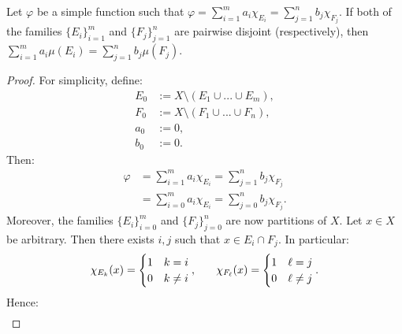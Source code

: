 \begin{lemma}
    Let $\varphi$ be a simple function such that $\varphi = \sum_{i = 1}^m a_i \chi_{E_i} = \sum_{j = 1}^n b_j \chi_{F_j}$. If both of the families $\{E_i\}_{i = 1}^m$ and $\{F_j\}_{j = 1}^n$ are pairwise disjoint (respectively), then $\sum_{i = 1}^m a_i \mu(E_i) = \sum_{j = 1}^n b_j \mu(F_j)$.
\end{lemma}
    \begin{proof}
        For simplicity, define:
            \begin{equation*}
            \begin{split}
                E_0 &:= X \setminus (E_1 \cup ... \cup E_m), \\
                F_0 &:= X \setminus (F_1 \cup ... \cup F_n), \\
                a_0 &:= 0, \\
                b_0 &:= 0.
            \end{split}
            \end{equation*}
        Then:
            \begin{equation*}
            \begin{split}
                \varphi
                & = \sum_{i = 1}^m a_i \chi_{E_i} = \sum_{j = 1}^n b_j \chi_{F_j} \\
                & =  \sum_{i = 0}^m a_i \chi_{E_i} = \sum_{j = 0}^n b_j \chi_{F_j}.
            \end{split}
            \end{equation*}
        Moreover, the families $\{E_i\}_{i = 0}^m$ and $\{F_j\}_{j = 0}^n$ are now partitions of $X$. Let $x \in X$ be arbitrary. Then there exists $i,j$ such that $x \in E_i \cap F_j$. In particular:
            \begin{equation*}
            \begin{split}
                \chi_{E_k}(x) = \begin{cases} 1 & k = i \\ 0 & k \neq i \end{cases}, \h9\h9 \chi_{F_\ell}(x) = \begin{cases} 1 & \ell = j \\ 0 & \ell \neq j \end{cases}.
            \end{split}
            \end{equation*}
        Hence:
            \begin{equation*}
            \begin{split}

\end{split}
\end{equation*}
\end{proof}
